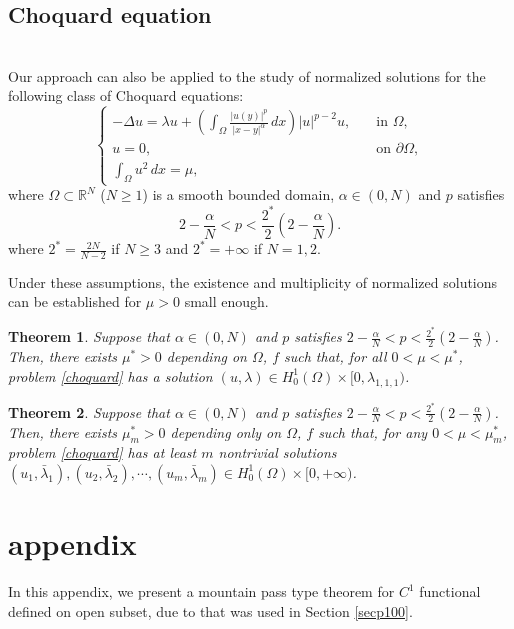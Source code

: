 \documentclass[11pt]{amsart}
\newtheorem{theorem}{Theorem}[section]
\numberwithin{equation}{section}
\begin{document}
\subsection{Choquard equation} \mbox{}\\
Our approach can also be applied to the study of normalized solutions for the following class of Choquard equations:
\begin{equation} \label{choquard}
	\left\{
	\begin{array}{ll}
		-\Delta u = \lambda u + \left(\int_{\Omega}\frac{|u(y)|^{p}}{|x-y|^{\alpha}} \, dx\right)|u|^{p-2}u, \quad & \text{in } \Omega, \\
		u = 0, & \text{on } \partial \Omega, \\
		\int_{\Omega} u^2\,dx = \mu,
	\end{array}
	\right.
\end{equation}
where $\Omega \subset \mathbb{R}^N$ ($N\geq 1$) is a smooth bounded domain, $\alpha \in (0,N)$ and $p$ satisfies
$$
2-\frac{\alpha}{N}<p<\frac{2^*}{2}\left(2-\frac{\alpha}{N} \right).
$$
where $2^* = \frac{2N}{N-2}$ if $N \geq 3$ and $2^* = +\infty$ if $N = 1, 2$.

Under these assumptions, the existence and multiplicity of normalized solutions can be established for $\mu>0$ small enough.
\begin{theorem}
Suppose that $\alpha \in (0,N)$ and $p$ satisfies
$
2-\frac{\alpha}{N}<p<\frac{2^*}{2}\left(2-\frac{\alpha}{N} \right)
$. Then, there exists $\mu^{*}>0$  depending on $\Omega$, $f$ such that, for all $0<\mu<\mu^{*}$, problem \eqref{choquard} has a solution $(u,\lambda) \in H^1_0(\Omega) \times  [0,\lambda_{1,1,1})$.
\end{theorem}
\begin{theorem}
Suppose that $\alpha \in (0,N)$ and $p$ satisfies
$
2-\frac{\alpha}{N}<p<\frac{2^*}{2}\left(2-\frac{\alpha}{N} \right)
$. Then, there exists $\mu^{*}_{m} > 0$ depending only on $\Omega$, $f$ such that, for any $0 < \mu < \mu^{*}_{m}$, problem \eqref{choquard}  has at least $m$ nontrivial solutions $(u_1,\bar{\lambda}_1), (u_2,\bar{\lambda}_2),\cdots,(u_m,\bar{\lambda}_m) \in H_0^{1}(\Omega)\times[0,+\infty)$.
\end{theorem}

 \section{appendix} \label{appa}
    In this appendix, we present a mountain pass type theorem for $C^1$ functional defined on open subset, due to \cite{Bu,Es} that was used in Section \ref{secp100}.
\end{document}
